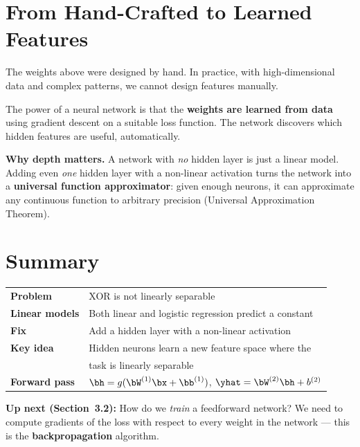 \documentclass[12pt, a4paper]{article}
\begin{document}
\section{From Hand-Crafted to Learned Features}

The weights above were designed by hand.  In practice, with high-dimensional
data and complex patterns, we cannot design features manually.

The power of a neural network is that the \textbf{weights are learned from
  data} using gradient descent on a suitable loss function.  The network
discovers which hidden features are useful, automatically.

\begin{notebox}
  \textbf{Why depth matters.}
  A network with \emph{no} hidden layer is just a linear model.  Adding even
  \emph{one} hidden layer with a non-linear activation turns the network into a
  \textbf{universal function approximator}: given enough neurons, it can
  approximate any continuous function to arbitrary precision (Universal
  Approximation Theorem).
\end{notebox}

\section{Summary}

\begin{center}
  \renewcommand{\arraystretch}{1.5}
  \begin{tabular}{ll}
    \toprule
    \textbf{Problem}       & XOR is not linearly separable                          \\
    \textbf{Linear models} & Both linear and logistic regression predict a constant \\
    \textbf{Fix}           & Add a hidden layer with a non-linear activation        \\
    \textbf{Key idea}      & Hidden neurons learn a new feature space where the     \\
                           & task is linearly separable                             \\
    \textbf{Forward pass}  & $\bh = g(\bW^{(1)}\bx + \bb^{(1)})$,\;
    $\yhat = \bW^{(2)}\bh + b^{(2)}$                                                \\
    \bottomrule
  \end{tabular}
\end{center}

\bigskip
\textbf{Up next (Section~3.2):} How do we \emph{train} a feedforward network?
We need to compute gradients of the loss with respect to every weight in the
network — this is the \textbf{backpropagation} algorithm.
\end{document}
